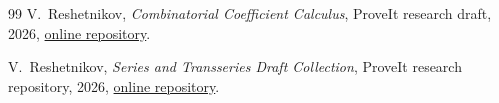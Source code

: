 \documentclass[11pt]{article}
\numberwithin{equation}{section}
\theoremstyle{mainthm}
\theoremstyle{defstyle}
\theoremstyle{remark}
\begin{document}
\begin{thebibliography}{99}
V.~Reshetnikov,
\emph{Combinatorial Coefficient Calculus},
ProveIt research draft, 2026,
\href{https://github.com/VladimirReshetnikov/ProveIt/tree/main/Analysis/FabiusFunction/docs/semi-formalized-research-frontiers/drafts/combinatorial-coefficient-calculus/Combinatorial_Coefficient_Calculus}{online repository}.

V.~Reshetnikov,
\emph{Series and Transseries Draft Collection},
ProveIt research repository, 2026,
\href{https://github.com/VladimirReshetnikov/ProveIt/tree/main/Analysis/FabiusFunction/docs/semi-formalized-research-frontiers/drafts/series-and-transseries}{online repository}.

\end{thebibliography}
\end{document}
